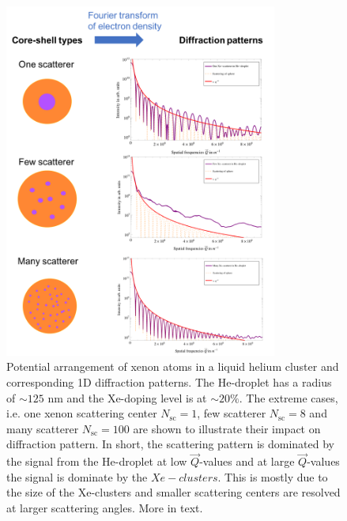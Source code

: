 \begin{figure}
 	\centering
 		\includegraphics[width=0.8\textwidth]{images/results/plum-pudding.png}
 	\caption[Potential arrangement of Xe-cluster within He-droplets.]{Potential arrangement of xenon atoms in a liquid helium cluster and corresponding 1D diffraction patterns. The He-droplet has a radius of $\sim 125$ nm and the Xe-doping level is at $\sim 20\%$. The extreme cases, i.e. one xenon scattering center $N_{\text{sc}}=1$, few scatterer $N_{\text{sc}}=8$ and many scatterer $N_{\text{sc}}=100$ are shown to illustrate their impact on diffraction pattern. In short, the scattering pattern is dominated by the signal from the He-droplet at low $\vec{Q}$-values and at large $\vec{Q}$-values the signal is dominate by the $Xe-clusters$. This is mostly due to the size of the Xe-clusters and smaller scattering centers are resolved at larger scattering angles. More in text.}
 	\label{fig:HeXe-plum-pudding}
\end{figure}
